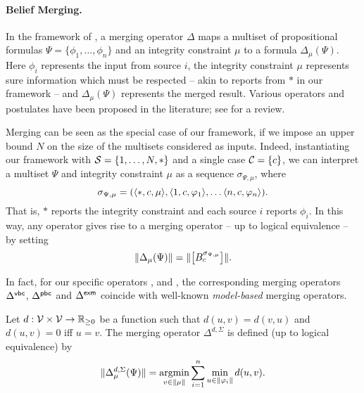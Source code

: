 \paragraph{Belief Merging.}

In the framework of \textcite{konieczny2002merging}, a merging operator
$\Delta$ maps a multiset of propositional formulas $\Psi =
\{\phi_1,\ldots,\phi_n\}$ and an integrity constraint $\mu$ to a formula
$\Delta_\mu(\Psi)$. Here $\phi_i$ represents the input from source $i$, the
integrity constraint $\mu$ represents sure information which must be respected
-- akin to reports from $\ast$ in our framework -- and $\Delta_\mu(\Psi)$
represents the merged result. Various operators and postulates have been
proposed in the literature; see \cite{Konieczny_2011} for a review.

Merging can be seen as the special case of our framework, if we impose an upper
bound $N$ on the size of the multisets considered as inputs. Indeed,
instantiating our framework with $\mathcal{S} = \{1, \ldots, N, \ast\}$ and a single
case $\mathcal{C} = \{c\}$, we can interpret a multiset $\Psi$ and integrity constraint
$\mu$ as a sequence $\sigma_{\Psi, \mu}$, where
\[
    \sigma_{\Psi, \mu}
    = (
        \langle {\ast, c, \mu} \rangle,
        \langle {1, c, \varphi_1} \rangle,
        \ldots
        \langle {n, c, \varphi_n} \rangle
    ).
\]
That is, $\ast$ reports the integrity constraint and each source $i$ reports
$\phi_i$.\footnotemark{}
%
In this way, any operator gives rise to a merging operator -- up to logical
equivalence -- by setting
\begin{equation}
    \label{kr_eqn_belief_merging_translation}
    \|{\Delta_\mu(\Psi)}\|
    =
    \|{\left[{B^{\sigma_{\Psi,\mu}}_c}\right]}\|.
\end{equation}


In fact, for our specific operators \varbasedcond{}, \partbasedcond{} and
\scorebasedop{}, the corresponding merging operators $\Delta^{\mathsf{vbc}}$,
$\Delta^{\mathsf{pbc}}$ and $\Delta^{\mathsf{exm}}$ coincide with well-known \emph{model-based}
merging operators.

\begin{definition}
    Let $d: \mathcal{V} \times \mathcal{V} \to \mathbb{R}_{\ge 0}$ be a function such that
    $d(u, v) = d(v, u)$ and $d(u, v) = 0$ iff $u = v$.\footnotemark{} The
    merging operator $\Delta^{d, {\Sigma}}$ is defined (up to logical
    equivalence) by
    \[
        \propmods{\Delta^{d, {\Sigma}}_\mu(\Psi)}
        =
        \argmin_{v \in \propmods{\mu}}{
            \sum_{i=1}^{n}{
                \min_{u \in \propmods{\phi_i}}{
                    d(u, v)
                }
            }
        }.
    \]
\end{definition}

